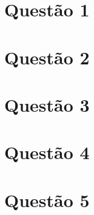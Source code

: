 \documentclass[fleqn]{beamer}\usepackage[]{graphicx}\usepackage[]{color}
\begin{document}
	\section{Questão 1}
	\section{Questão 2}
	\section{Questão 3}
	\section{Questão 4}
	\section{Questão 5}
\end{document}
